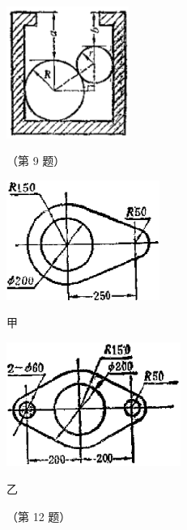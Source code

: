 \begin{xiaotis}
\begin{enhancedline}
\begin{figure}[htbp]
    \centering
    \begin{minipage}[b]{4.1cm}
        \includegraphics[width=4cm]{../pic/czjh2-ch7-xiti26-09.png}
        \caption*{}
        \caption*{（第 9 题）}
    \end{minipage}
    \qquad
    \begin{minipage}[b]{11cm}
        \begin{minipage}[b]{5.1cm}
            \centering
            \includegraphics[width=5cm]{../pic/czjh2-ch7-xiti26-12-a.png}
            \caption*{甲}
        \end{minipage}
        \begin{minipage}[b]{5.8cm}
            \centering
            \includegraphics[width=5.7cm]{../pic/czjh2-ch7-xiti26-12-b.png}
            \caption*{乙}
        \end{minipage}
        \caption*{（第 12 题）}
    \end{minipage}
\end{figure}

\begin{xiaoxiaotis}



\end{xiaoxiaotis}
\end{enhancedline}
\end{xiaotis}
